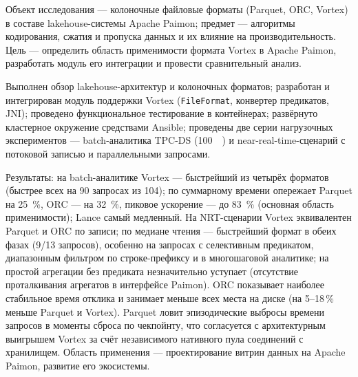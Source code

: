 \abstract %


Объект исследования --- колоночные файловые форматы (Parquet, ORC, Vortex) в
составе lakehouse-системы Apache Paimon; предмет --- алгоритмы кодирования,
сжатия и пропуска данных и их влияние на производительность. Цель --- определить
область применимости формата Vortex в Apache Paimon, разработать модуль его
интеграции и провести сравнительный анализ.

Выполнен обзор lakehouse-архитектур и колоночных форматов; разработан и
интегрирован модуль поддержки Vortex (\texttt{FileFormat}, конвертер предикатов,
JNI); проведено функциональное тестирование в контейнерах; развёрнуто кластерное
окружение средствами Ansible; проведены две серии нагрузочных экспериментов ---
batch-аналитика TPC-DS (\SI{100}{\giga\byte}) и near-real-time-сценарий с
потоковой записью и параллельными запросами.

Результаты: на batch-аналитике Vortex --- быстрейший из четырёх форматов
(быстрее всех на \num{90} запросах из \num{104}); по суммарному времени опережает
Parquet на \SI{25}{\percent}, ORC --- на \SI{32}{\percent}, пиковое ускорение ---
до \SI{83}{\percent} (основная область применимости); Lance самый медленный. На NRT-сценарии Vortex
эквивалентен Parquet и ORC по записи; по медиане чтения --- быстрейший формат в
обеих фазах (9/13 запросов), особенно на запросах с селективным предикатом,
диапазонным фильтром по строке-префиксу и в многошаговой аналитике; на простой
агрегации без предиката незначительно уступает (отсутствие проталкивания
агрегатов в интерфейсе Paimon). ORC показывает наиболее стабильное время отклика и занимает меньше всех места
на диске (на 5--18\,\% меньше Parquet и Vortex). Parquet ловит
эпизодические выбросы времени запросов в моменты сброса по чекпойнту, что
согласуется с архитектурным выигрышем Vortex за счёт независимого нативного
пула соединений с хранилищем. Область применения --- проектирование витрин данных
на Apache Paimon, развитие его экосистемы.
